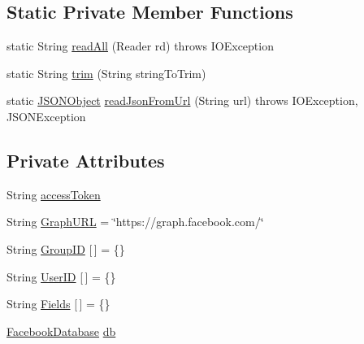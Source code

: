 \subsection*{Static Private Member Functions}
\begin{DoxyCompactItemize}
\item 
static String \hyperlink{classorg_1_1facebook_1_1crawler_1_1_facebook_json_parser_a17a61b33567c78bc8e726c1df6ede898}{read\-All} (Reader rd)  throws I\-O\-Exception 
\item 
static String \hyperlink{classorg_1_1facebook_1_1crawler_1_1_facebook_json_parser_aef196cddd66541bd78f99e543f3fc7bc}{trim} (String string\-To\-Trim)
\item 
static \hyperlink{classorg_1_1json_1_1_j_s_o_n_object}{J\-S\-O\-N\-Object} \hyperlink{classorg_1_1facebook_1_1crawler_1_1_facebook_json_parser_ad27f29e060383659be657f065bd069c2}{read\-Json\-From\-Url} (String url)  throws I\-O\-Exception, J\-S\-O\-N\-Exception 
\end{DoxyCompactItemize}
\subsection*{Private Attributes}
\begin{DoxyCompactItemize}
\item 
String \hyperlink{classorg_1_1facebook_1_1crawler_1_1_facebook_json_parser_a31fa96aed58c0b5ab6a156224d88cc19}{access\-Token}
\item 
String \hyperlink{classorg_1_1facebook_1_1crawler_1_1_facebook_json_parser_a432ef64a6d8e4575ff9e1f03a2fb1ab2}{Graph\-U\-R\-L} = \char`\"{}https\-://graph.\-facebook.\-com/\char`\"{}
\item 
String \hyperlink{classorg_1_1facebook_1_1crawler_1_1_facebook_json_parser_a648157fbf1ba62f4197ce78c35a4a5da}{Group\-I\-D} \mbox{[}$\,$\mbox{]} = \{\}
\item 
String \hyperlink{classorg_1_1facebook_1_1crawler_1_1_facebook_json_parser_ac872d203f33324d357f697597cc51da0}{User\-I\-D} \mbox{[}$\,$\mbox{]} = \{\}
\item 
String \hyperlink{classorg_1_1facebook_1_1crawler_1_1_facebook_json_parser_a5e950f9470c73a8ee7cfdafbe95ab100}{Fields} \mbox{[}$\,$\mbox{]} = \{\}
\item 
\hyperlink{classorg_1_1facebook_1_1crawler_1_1_facebook_database}{Facebook\-Database} \hyperlink{classorg_1_1facebook_1_1crawler_1_1_facebook_json_parser_a0411f79e4986d72a4274a775d54ed42e}{db}
\end{DoxyCompactItemize}


